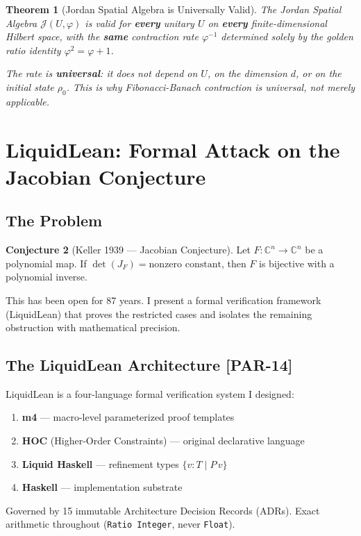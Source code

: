 \documentclass[12pt, letterpaper]{article}
\theoremstyle{plain}
\newtheorem{theorem}{Theorem}[section]
\theoremstyle{definition}
\newtheorem{conjecture}[theorem]{Conjecture}
\theoremstyle{remark}
\newcommand{\prior}[1]{\textcolor{SovGold}{\textbf{[PAR-#1]}}}
\begin{document}
\begin{theorem}[Jordan Spatial Algebra is Universally Valid]
\label{thm:universal}
The Jordan Spatial Algebra $\mathcal{J}(U, \varphi)$ is valid for \textbf{every}
unitary $U$ on \textbf{every} finite-dimensional Hilbert space, with the \textbf{same}
contraction rate $\varphi^{-1}$ determined solely by the golden ratio identity
$\varphi^2 = \varphi + 1$.

The rate is \textbf{universal}: it does not depend on $U$, on the dimension $d$,
or on the initial state $\rho_0$. This is why Fibonacci-Banach contraction is
\textit{universal}, not merely applicable.
\end{theorem}

\section{LiquidLean: Formal Attack on the Jacobian Conjecture}

\subsection{The Problem}

\begin{conjecture}[Keller 1939 --- Jacobian Conjecture]
Let $F: \mathbb{C}^n \to \mathbb{C}^n$ be a polynomial map. If
$\det(J_F) = \text{nonzero constant}$, then $F$ is bijective with a
polynomial inverse.
\end{conjecture}

This has been open for 87 years. I present a formal verification framework
(LiquidLean) that proves the restricted cases and isolates the remaining obstruction
with mathematical precision.

\subsection{The LiquidLean Architecture \prior{14}}

\begin{noveltybox}[title={LiquidLean: Original Formal Verification System}]
LiquidLean is a four-language formal verification system I designed:
\begin{enumerate}[nosep]
  \item \textbf{m4} --- macro-level parameterized proof templates
  \item \textbf{HOC} (Higher-Order Constraints) --- original declarative language
  \item \textbf{Liquid Haskell} --- refinement types $\{v : T \mid P\,v\}$
  \item \textbf{Haskell} --- implementation substrate
\end{enumerate}
Governed by 15 immutable Architecture Decision Records (ADRs).
Exact arithmetic throughout (\texttt{Ratio Integer}, never \texttt{Float}).
\end{noveltybox}
\end{document}

